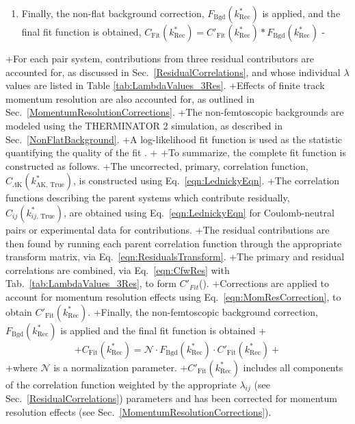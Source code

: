 \begin{table}[htbp]
\begin{table}[htbp]
\begin{enumerate}
- \item Finally, the non-flat background correction, $F_{\mathrm{Bgd}}(k^{*}_{\mathrm{Rec}})$ is applied, and the final fit function is obtained, $C_{\mathrm{Fit}}(k^{*}_{\mathrm{Rec}}) = C'_{\mathrm{Fit}}(k^{*}_{\mathrm{Rec}})*F_{\mathrm{Bgd}}(k^{*}_{\mathrm{Rec}})$
-\end{enumerate}
+For each pair system, contributions from three residual contributors are accounted for, as discussed in Sec.\ \ref{ResidualCorrelations}, and whose individual $\lambda$ values are listed in Table \ref{tab:LambdaValues_3Res}.
+Effects of finite track momentum resolution are also accounted for, as outlined in Sec.\ \ref{MomentumResolutionCorrections}.
+The non-femtoscopic backgrounds are modeled using the THERMINATOR 2 simulation, as described in Sec.\ \ref{NonFlatBackground}.
+A log-likelihood fit function is used as the statistic quantifying the quality of the fit \cite{Lisa:2005dd}.
+
+To summarize, the complete fit function is constructed as follows.
+The uncorrected, primary, correlation function, $C_{\Lambda\mathrm{K}}(k^{*}_{\mathrm{\Lambda K,\,True}})$, is constructed using Eq.\ \ref{eqn:LednickyEqn}.
+The correlation functions describing the parent systems which contribute residually, $C_{ij}(k^{*}_{ij,\,\mathrm{True}})$, are obtained using Eq.\ \ref{eqn:LednickyEqn} for Coulomb-neutral pairs or experimental data for \XiKpm contributions.
+The residual contributions are then found by running each parent correlation function through the appropriate transform matrix, via Eq.\ \ref{eqn:ResidualsTransform}.
+The primary and residual correlations are combined, via Eq.\ \ref{eqn:CfwRes} with Tab.\ \ref{tab:LambdaValues_3Res}, to form $C'_{Fit}$(\ktrue).
+Corrections are applied to account for momentum resolution effects using Eq.\ \ref{eqn:MomResCorrection}, to obtain $C'_{\mathrm{Fit}}(k^{*}_{\mathrm{Rec}})$.
+Finally, the non-femtoscopic background correction, $F_{\mathrm{Bgd}}(k^{*}_{\mathrm{Rec}})$ is applied and the final fit function is obtained 
+\begin{equation}
+C_{\mathrm{Fit}}(k^{*}_{\mathrm{Rec}}) = \mathcal{N}\cdot F_{\mathrm{Bgd}}(k^{*}_{\mathrm{Rec}})\cdot C'_{\mathrm{Fit}}(k^{*}_{\mathrm{Rec}})
+\end{equation}
+where $\mathcal{N}$ is a normalization parameter.
+$C'_{\mathrm{Fit}}(k^{*}_{\mathrm{Rec}})$ includes all components of the correlation function weighted by the appropriate $\lambda_{ij}$ (see Sec.\ \ref{ResidualCorrelations}) parameters and has been corrected for momentum resolution effects (see Sec.\ \ref{MomentumResolutionCorrections}).
 

\end{table}
\end{table}
